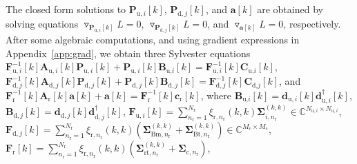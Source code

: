 \documentclass[10pt,journal]{IEEEtran}
\newcommand{\paren}[1]{\left({#1}\right)}
\newcommand{\bracket}[1]{{\left [{#1}\right ]}}
\newcommand{\rr}{_\mathrm{r}}
\newcommand{\dBjone}{\mathbf{d}_{\mathrm{d},j}\bracket{k}}
\newcommand{\dBjoneH}{\mathbf{d}^\dagger_{\textrm{d},j}\bracket{k}}
\newcommand{\PiB}{\mathbf{P}_{\textrm{u},i}\bracket{k}}
\newcommand{\PBj}{\mathbf{P}_{\textrm{d},j}\bracket{k}}
\theoremstyle{definition}
\begin{document}
The closed form solutions to $\PiB$, $\PBj$, and $\mathbf{a}\bracket{k}$ are obtained by solving equations $\triangledown_{\mathbf{P}_{\textrm{u},i}\bracket{k}}L=0$, $\triangledown_{\mathbf{P}_{\textrm{d},j}\bracket{k}}L=0$, and $\triangledown_{\mathbf{a}\bracket{k}}L=0$, respectively.
After some algebraic computations, %
and using gradient expressions in Appendix~\ref{app:grad}, we obtain three Sylvester equations $\mathbf{F}_{\textrm{u},i}^{-1}\bracket{k}\mathbf{A}_{\textrm{u},i}\bracket{k}\mathbf{P}_{\textrm{u},i}\bracket{k}+\mathbf{P}_{\textrm{u},i}\bracket{k}\mathbf{B}_{\textrm{u,}i}\bracket{k}=\mathbf{F}_{\textrm{u},i}^{-1}\bracket{k}\mathbf{C}_{\textrm{u,}i}\bracket{k}$, $\mathbf{F}_{\textrm{d},j}^{-1}\bracket{k}\mathbf{A}_{\textrm{d},j}\bracket{k}\mathbf{P}_{\textrm{d},j}\bracket{k}+\mathbf{P}_{\textrm{d},j}\bracket{k}\mathbf{B}_{\textrm{d},j}\bracket{k}=\mathbf{F}_{\textrm{d},j}^{-1}\bracket{k}\mathbf{C}_{\textrm{d,}j}\bracket{k}$, and $\mathbf{F}_{\textrm{r}}^{-1}\bracket{k}\mathbf{A}_{\textrm{r}}\bracket{k}\mathbf{a}\bracket{k}+\mathbf{a}\bracket{k}=\mathbf{F}_{\textrm{r}}^{-1}\bracket{k}\mathbf{c}_{\textrm{r}}\bracket{k}$, where $\mathbf{B}_{\textrm{u,}i}\bracket{k} =\mathbf{d}_{\mathrm{u},i}\bracket{k}\mathbf{d}^\dagger_{\textrm{u},i}\bracket{k}$, $\mathbf{B}_{\textrm{d},j}\bracket{k}=\dBjone\dBjoneH$, $\mathbf{F}_{\textrm{u},i}\bracket{k}=\sum_{n\rr=1}^{N\rr}\xi_{\textrm{r},n\rr}\paren{k,k}\boldsymbol{\Sigma}^{\paren{k,k}}_{i,n\rr}\in\mathbb{C}^{N_{\textrm{u},i}\times N_{\textrm{u},i}}$, $\mathbf{F}_{\textrm{d},j}\bracket{k}=\sum_{n\rr=1}^{N\rr}\xi_{\textrm{r},n\rr}\paren{k,k}\paren{\boldsymbol{\Sigma}^{\paren{k,k}}_{\textrm{Bm},n\rr}+\boldsymbol{\Sigma}^{\paren{k,k}}_{\textrm{Bt},n\rr}}\in\mathbb{C}^{M_{\textrm{c}}\times M_{\textrm{c}}}$, $\mathbf{F}_{\textrm{r}}\bracket{k}=\sum_{n\rr=1}^{\mathit{N}\rr}\xi_{\textrm{r},n\rr}\paren{k,k}\paren{\boldsymbol{\Sigma}^{\paren{k,k}}_{\mathrm{rt},n\rr}+\boldsymbol{\Sigma}_{\textrm{c},n\rr}}$,
\end{document}
